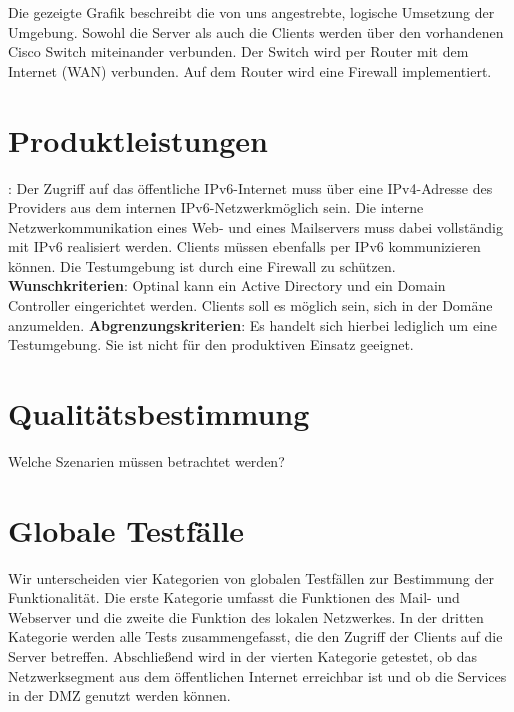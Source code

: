 Die gezeigte Grafik beschreibt die von uns angestrebte, logische Umsetzung der Umgebung. Sowohl die Server als auch die Clients werden über den vorhandenen Cisco Switch miteinander verbunden. Der Switch wird per Router mit dem Internet (WAN) verbunden. Auf dem Router wird eine Firewall implementiert.







\section{Produktleistungen}

: Der Zugriff auf das öffentliche IPv6-Internet muss über eine IPv4-Adresse des Providers aus dem internen IPv6-Netzwerkmöglich sein. Die interne Netzwerkommunikation eines Web- und eines Mailservers muss dabei vollständig mit IPv6 realisiert werden. Clients müssen ebenfalls per IPv6 kommunizieren können. Die Testumgebung ist durch eine Firewall zu schützen. {\bf Wunschkriterien}: Optinal kann ein Active Directory und ein Domain Controller eingerichtet werden. Clients soll es möglich sein, sich in der Domäne anzumelden. {\bf Abgrenzungskriterien}: Es handelt sich hierbei lediglich um eine Testumgebung. Sie ist nicht für den produktiven Einsatz geeignet.\section{Qualitätsbestimmung}

Welche Szenarien müssen betrachtet werden?





\section{Globale Testfälle}

Wir unterscheiden vier Kategorien von globalen Testfällen zur Bestimmung der Funktionalität. Die erste Kategorie umfasst die Funktionen des Mail- und Webserver und die zweite die Funktion des lokalen Netzwerkes. In der dritten Kategorie werden alle Tests zusammengefasst, die den Zugriff der Clients auf die Server betreffen. Abschließend wird in der vierten Kategorie getestet, ob das Netzwerksegment aus dem öffentlichen Internet erreichbar ist und ob die Services in der DMZ genutzt werden können.

